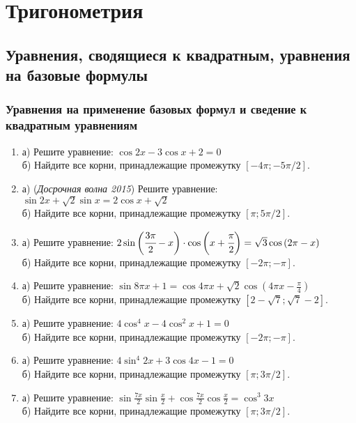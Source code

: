 \documentclass[12pt]{article}
\begin{document}

\tableofcontents
\newpage
\section{Тригонометрия}
	\subsection{Уравнения, сводящиеся к квадратным, уравнения на базовые формулы}
\subsubsection*{Уравнения на применение базовых формул и сведение к квадратным уравнениям}
\begin{enumerate}[start=1,label={\itshape\bfseries \arabic*.}]
\item  а) Решите уравнение: $\cos{2x} - 3\cos{x} + 2 = 0$\\
  б) Найдите все корни, принадлежащие промежутку $[-4\pi;- 5\pi / 2]$.
\item а) (\textit{Досрочная волна 2015}) Решите уравнение: $\sin{2x} +\sqrt{2}\sin{x} = 2\cos{x} + \sqrt{2}$ \\
  б) Найдите все корни, принадлежащие промежутку $[\pi; 5\pi / 2]$.

\item  а) Решите уравнение: $2\sin{\bigg(\cfrac{3\pi}{2} - x\bigg)} \cdot \cos{\bigg(x + \cfrac{\pi}{2}\bigg)} = \sqrt{3} \cos{(2\pi - x)} $\\
  б) Найдите все корни, принадлежащие промежутку $[-2\pi; -\pi]$.

\item  а) Решите уравнение: $\sin{8\pi x} + 1 = \cos{4\pi x} + \sqrt{2} \cos{(4\pi x - \frac{\pi}{4})}$\\
  б) Найдите все корни, принадлежащие промежутку $[2 - \sqrt{7};\sqrt{7} - 2]$.

\item  а) Решите уравнение: $4\cos^4{x} - 4\cos^2{x} + 1 = 0$\\
  б) Найдите все корни, принадлежащие промежутку $[-2\pi;-\pi]$.

\item  а) Решите уравнение: $4\sin^4{2x} + 3\cos{4x} -1 = 0$\\
  б) Найдите все корни, принадлежащие промежутку $[\pi; 3\pi / 2]$.

\item  а) Решите уравнение: $\sin{\frac{7x}{2}}\sin{\frac{x}{2}} + \cos{\frac{7x}{2}}\cos{\frac{x}{2}} = \cos^3{3x}$\\
б) Найдите все корни, принадлежащие промежутку $[\pi; 3\pi / 2]$.


\end{enumerate}
\end{document}
